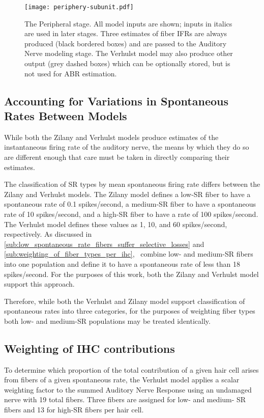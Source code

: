 \begin{figure}[htbp]
	\centering
	\texttt{[image: periphery-subunit.pdf]}
	\caption[The Peripheral Stage]{The Peripheral stage. All model inputs are shown; inputs in italics are used in later stages.  Three estimates of fiber IFRs are always produced (black bordered boxes) and are passed to the Auditory Nerve modeling stage.  The Verhulst model may also produce other output (grey dashed boxes) which can be optionally stored, but is not used for ABR estimation. }
	\label{fig:periphery-stage}
\end{figure}

\subsection{Accounting for Variations in Spontaneous Rates Between Models} %
\label{sub:interoperability_of_the_zilany_and_verhulst_models}
While both the Zilany and Verhulst models produce estimates of the instantaneous firing rate of the auditory nerve, the means by which they do so are different enough that care must be taken in directly comparing their estimates.  

The classification of SR types by mean spontaneous firing rate differs between the Zilany and Verhulst models.  The Zilany model defines a low-SR fiber to have a spontaneous rate of 0.1 spikes/second, a medium-SR fiber to have a spontaneous rate of 10 spikes/second, and a high-SR fiber to have a rate of 100 spikes/second.  The Verhulst model defines these values as 1, 10, and 60 spikes/second, respectively.  As discussed in \autoref{sub:low_spontaneous_rate_fibers_suffer_selective_losses} and \autoref{sub:weighting_of_fiber_types_per_ihc},~\cite{Temchin2008Threshold} combine low- and medium-SR fibers into one population and define it to have a spontaneous rate of less than 18 spikes/second.  For the purposes of this work, both the Zilany and Verhulst model support this approach.  

Therefore, while both the Verhulst and Zilany model support classification of spontaneous rates into three categories, for the purposes of weighting fiber types both low- and medium-SR populations may be treated identically.  

\subsection{Weighting of IHC contributions} %
\label{sub:weighting_of_ihc_contribution}
To determine which proportion of the total contribution of a given hair cell arises from fibers of a given spontaneous rate, the Verhulst model applies a scalar weighting factor to the summed Auditory Nerve Response using an undamaged nerve with 19 total fibers. Three fibers are assigned for low- and medium- SR fibers and 13 for high-SR fibers per hair cell. 

